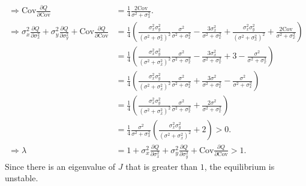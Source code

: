 \documentclass{article}
\newcommand{\Cov}{\text{Cov}}
\begin{document}
\begin{enumerate}
\begin{align*}
\\ \Rightarrow \Cov\frac{\partial Q}{\partial \Cov}&=\frac{1}{4}\frac{2\Cov}{\sigma^2+\sigma_x^2}.
\\ \Rightarrow \sigma_x^2\frac{\partial Q}{\partial \sigma_x^2}+\sigma_y^2\frac{\partial Q}{\partial \sigma_y^2}+\Cov\frac{\partial Q}{\partial \Cov}&=\frac{1}{4}\left(\frac{\sigma_x^2\sigma_y^2}{(\sigma^2+\sigma_x^2)^2}\frac{\sigma^2}{\sigma^2+\sigma_x^2}-\frac{3\sigma_x^2}{\sigma^2+\sigma_x^2}+\frac{\sigma_x^2\sigma_y^2}{(\sigma^2+\sigma_x^2)^2}+\frac{2\Cov}{\sigma^2+\sigma_x^2}\right)
\\ &=\frac{1}{4}\left(\frac{\sigma_x^2\sigma_y^2}{(\sigma^2+\sigma_x^2)^2}\frac{\sigma^2}{\sigma^2+\sigma_x^2}-\frac{3\sigma_x^2}{\sigma^2+\sigma_x^2}+3-\frac{\sigma^2}{\sigma^2+\sigma_x^2}\right)
\\&=\frac{1}{4}\left(\frac{\sigma_x^2\sigma_y^2}{(\sigma^2+\sigma_x^2)^2}\frac{\sigma^2}{\sigma^2+\sigma_x^2}+\frac{3\sigma^2}{\sigma^2+\sigma_x^2}-\frac{\sigma^2}{\sigma^2+\sigma_x^2}\right)
\\&=\frac{1}{4}\left(\frac{\sigma_x^2\sigma_y^2}{(\sigma^2+\sigma_x^2)^2}\frac{\sigma^2}{\sigma^2+\sigma_x^2}+\frac{2\sigma^2}{\sigma^2+\sigma_x^2}\right)
\\&=\frac{1}{4}\frac{\sigma^2}{\sigma^2+\sigma_x^2}\left(\frac{\sigma_x^2\sigma_y^2}{(\sigma^2+\sigma_x^2)^2}+2\right)>0.
\\ \Rightarrow \lambda &=1+\sigma_x^2\frac{\partial Q}{\partial \sigma_x^2}+\sigma_y^2\frac{\partial Q}{\partial \sigma_y^2}+\Cov\frac{\partial Q}{\partial \Cov}>1.
\end{align*}
Since there is an eigenvalue of $J$ that is greater than $1$, the equilibrium is unstable.


\end{enumerate}
\end{document}

